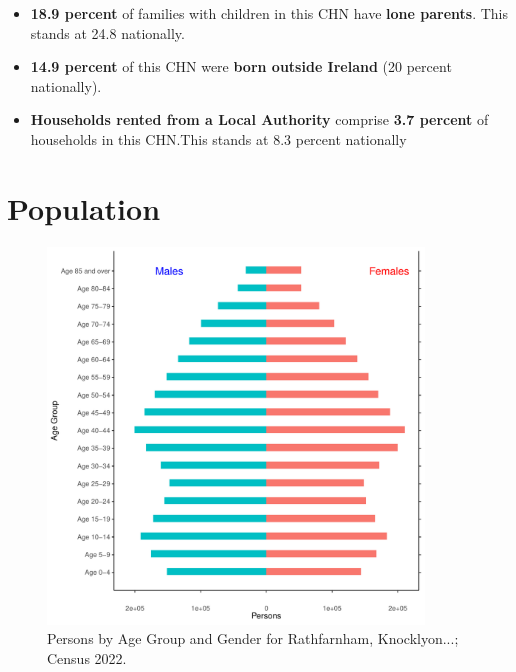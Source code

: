 \documentclass{article}
\begin{document}
\begin{itemize}
\item \textbf{18.9 percent} of families with children in this CHN have \textbf{lone parents}. This stands at 24.8 nationally.

\item \textbf{14.9 percent} of this CHN were \textbf{born outside Ireland} (20 percent nationally).

\item \textbf{Households rented from a Local Authority} comprise \textbf{3.7 percent} of households in this CHN.This stands at 8.3 percent nationally

\end{itemize}

\pagebreak

\section{Population} 
\label{sect:Pop}

\begin{figure}[h]
	\centering
	\includegraphics[width = 100mm]{../figures/PyramidPlot.pdf}
	\caption{Persons by Age Group and Gender for Rathfarnham, Knocklyon...; Census 2022.}
	\label{fig:2ae19629-1a6a-13a3-e055-000000000001}
	\end{figure}
\end{document}
